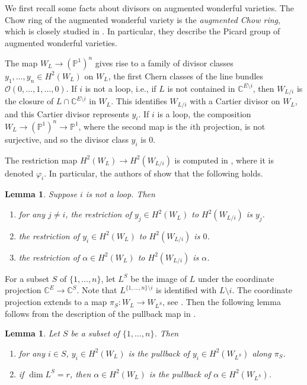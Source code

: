 \documentclass{amsart}
\newtheorem{lemma}[theorem]{Lemma}
\theoremstyle{definition}
\begin{document}
We first recall some facts about divisors on augmented wonderful 
varieties. The Chow ring of the augmented wonderful variety is the \emph{augmented Chow ring}, which is closely studied in \cite{BHMPW20a}. In particular, they describe the Picard group of augmented wonderful varieties.

The map $W_L \to (\mathbb{P}^1)^n$ gives rise to a family of divisor 
classes $y_1, \dotsc, y_n \in H^2(W_L)$ on $W_L$, the first Chern 
classes of the line bundles $\mathcal{O}(0, \dotsc, 1, \dotsc, 0)$. If 
$i$ is not a loop, i.e., if $L$ is not contained in $\mathbb{C}^{E 
\setminus i}$, then $W_{L/i}$ is the closure of $L \cap \mathbb{C}^{E 
\setminus i}$ in $W_L$. This identifies $W_{L/i}$ with a Cartier divisor 
on $W_L$, and this Cartier divisor represents $y_i$. 
If $i$ is a loop, the composition $W_L \to (\mathbb{P}^1)^n \to \mathbb{P}^1$, where the second map is the $i$th projection, is not surjective, and so the divisor class $y_i$ is $0$. 

The restriction map $H^2(W_L) \to H^2(W_{L/i})$ is computed in \cite[Proposition 2.28]{BHMPW20a}, where it is denoted $\varphi_i$. In particular, the authors of \cite{BHMPW20a} show that the following holds. 

\begin{lemma}\label{lem:restrictdiv}
Suppose $i$ is not a loop. Then
\begin{enumerate}
\item for any $j \not= i$, the restriction of $y_j \in H^2(W_L)$ to $H^2(W_{L /i})$ is $y_j$. 
\item the restriction of $y_i \in H^2(W_L)$ to $H^2(W_{L/i})$ is $0$. 
\item the restriction of $\alpha \in H^2(W_L)$ to $H^2(W_{L/i})$ is $\alpha$. 
\end{enumerate}
\end{lemma}


For a subset $S$ of $\{1, \dotsc, n\}$, let $L^S$ be the image of $L$ under the coordinate projection $\mathbb{C}^E \to \mathbb{C}^S$. Note that $L^{\{1, \dotsc, n\} \setminus i}$ is identified with $L \setminus i$.  The coordinate projection extends to a map $\pi_S \colon W_L \to W_{L^S}$, see \cite[Remark 3.2]{BHMPW20a}. Then the following lemma follows from the description of the pullback map in \cite[Section 3]{BHMPW20a}. 

\begin{lemma}\label{lem:pullback}
Let $S$ be a subset of $\{1, \dotsc, n\}$. Then
\begin{enumerate}
\item for any $i \in S$, $y_i \in H^2(W_L)$ is the pullback of $y_i \in H^2(W_{L^S})$ along $\pi_S$. 
\item if $\dim L^S = r$, then $\alpha \in H^2(W_L)$ is the pullback of $\alpha \in H^2(W_{L^S})$. 
\end{enumerate}
\end{lemma}
\end{document}
